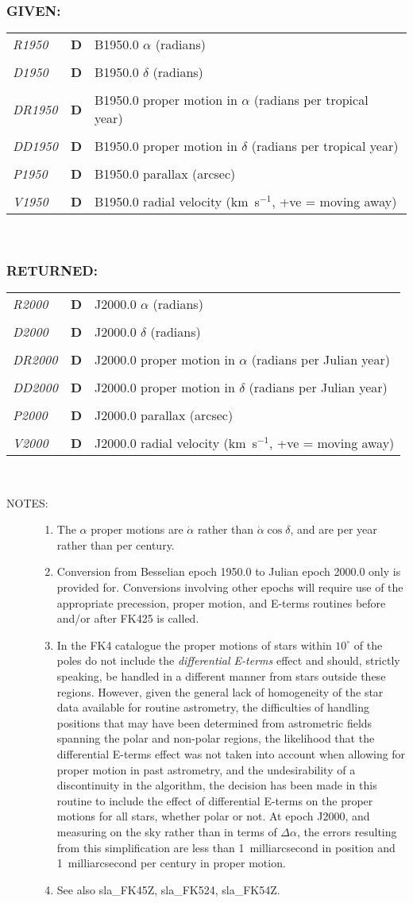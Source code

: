 \documentclass[11pt,twoside,nolof]{starlink}
\newcommand{\args}[2]{
  \subsubsection*{#1:}
     \begin{tabular}{p{7em}p{6em}p{22em}}
       #2
     \end{tabular}\\
}
\newcommand{\spec}[3]
{
  \emph{{#1}} & {\textbf{\mbox{#2}}} & {#3} \\
}
\newcommand{\notes}[1]
 {
   \begin{description}
     \item[NOTES:]
         #1
   \end{description}
}
\begin{document}
\args{GIVEN}
{
 \spec{R1950}{D}{B1950.0 $\alpha$ (radians)} \\
 \spec{D1950}{D}{B1950.0 $\delta$ (radians)} \\
 \spec{DR1950}{D}{B1950.0 proper motion in $\alpha$
                              (radians per tropical year)} \\
 \spec{DD1950}{D}{B1950.0 proper motion in $\delta$
                              (radians per tropical year)} \\
 \spec{P1950}{D}{B1950.0 parallax (arcsec)} \\
 \spec{V1950}{D}{B1950.0 radial velocity (km~s$^{-1}$, +ve = moving away)}
}
\args{RETURNED}
{
 \spec{R2000}{D}{J2000.0 $\alpha$ (radians)} \\
 \spec{D2000}{D}{J2000.0 $\delta$ (radians)} \\
 \spec{DR2000}{D}{J2000.0 proper motion in $\alpha$
                              (radians per Julian year)} \\
 \spec{DD2000}{D}{J2000.0 proper motion in $\delta$
                              (radians per Julian year)} \\
 \spec{P2000}{D}{J2000.0 parallax (arcsec)} \\
 \spec{V2000}{D}{J2000.0 radial velocity (km~s$^{-1}$, +ve = moving away)}
}
\notes
{
 \begin{enumerate}
  \item The $\alpha$ proper motions are $\dot{\alpha}$ rather than
        $\dot{\alpha}\cos\delta$, and are per year rather than per century.
  \item Conversion from Besselian epoch 1950.0 to Julian epoch
        2000.0 only is provided for.  Conversions involving other
        epochs will require use of the appropriate precession,
        proper motion, and E-terms routines before and/or after FK425
        is called.
  \item In the FK4 catalogue the proper motions of stars within
        $10^{\circ}$ of the poles do not include the \textit{differential
        E-terms}\/ effect and should, strictly speaking, be handled
        in a different manner from stars outside these regions.
        However, given the general lack of homogeneity of the star
        data available for routine astrometry, the difficulties of
        handling positions that may have been determined from
        astrometric fields spanning the polar and non-polar regions,
        the likelihood that the differential E-terms effect was not
        taken into account when allowing for proper motion in past
        astrometry, and the undesirability of a discontinuity in
        the algorithm, the decision has been made in this routine to
        include the effect of differential E-terms on the proper
        motions for all stars, whether polar or not.  At epoch J2000,
        and measuring on the sky rather than in terms of $\Delta\alpha$,
        the errors resulting from this simplification are less than
        1~milliarcsecond in position and 1~milliarcsecond per
        century in proper motion.
  \item See also sla\_FK45Z, sla\_FK524, sla\_FK54Z.
 \end{enumerate}
}
\end{document}
